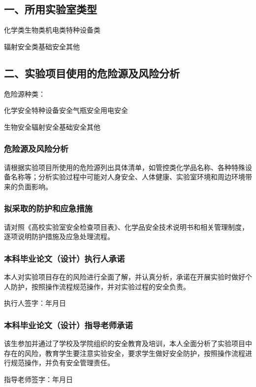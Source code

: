 \subsection*{一、所用实验室类型}
\noindent
\riskcheck 化学类\quad \riskcheck 生物类\quad \riskcheck 机电类\quad \riskcheck 特种设备类\par
\noindent
\riskcheck 辐射安全类\quad \riskcheck 基础安全\quad \riskcheck 其他

\subsection*{二、实验项目使用的危险源及风险分析}
\noindent 危险源种类：\par
\noindent
\riskcheck 化学安全\quad \riskcheck 特种设备安全\quad \riskcheck 气瓶安全\quad \riskcheck 用电安全\par
\noindent
\riskcheck 生物安全\quad \riskcheck 辐射安全\quad \riskcheck 基础安全\quad \riskcheck 其他

\subsubsection*{危险源及风险分析}
请根据实验项目所使用的危险源列出具体清单，如管控类化学品名称、各种特殊设备名称等；分析实验过程中可能对人身安全、人体健康、实验室环境和周边环境带来的负面影响。

\subsubsection*{拟采取的防护和应急措施}
请对照《高校实验室安全检查项目表》、化学品安全技术说明书和相关管理制度，逐项说明防护措施及应急处理流程。

\subsubsection*{本科毕业论文（设计）执行人承诺}
本人对实验项目存在的风险进行全面了解，并认真分析，承诺在开展实验时做好个人防护，按照操作流程规范操作，并对实验过程的安全负责。

\noindent 执行人签字：\blankfield{3cm}{}\hfill 年\quad 月\quad 日\par

\subsubsection*{本科毕业论文（设计）指导老师承诺}
该生参加并通过了学校及学院组织的安全教育及培训，本人全面分析了实验项目中存在的风险，教育学生要注意实验安全，要求学生做好安全防护，按照操作流程进行规范操作，并负有安全管理责任。

\noindent 指导老师签字：\blankfield{3cm}{}\hfill 年\quad 月\quad 日
